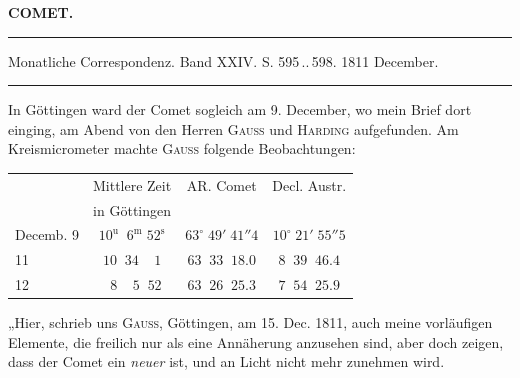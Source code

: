 \clearpage{}\hypertarget{native-348-lower}{}\label{native-348-lower}
\begin{center}\textbf{COMET.}\par\vspace{4pt}\hrule\vspace{4pt}\fontsize{10}{12}\selectfont Monatliche Correspondenz. Band XXIV. S. 595\,..\,598. 1811 December.\par\vspace{4pt}\hrule\vspace{4pt}\end{center}

\par\indent In Göttingen ward der Comet sogleich am 9. December, wo mein Brief dort einging, am Abend von den Herren \textsc{Gauss} und \textsc{Harding} aufgefunden. Am Kreismicrometer machte \textsc{Gauss} folgende Beobachtungen:

\begin{center}
\fontsize{10}{12}\selectfont\setlength{\tabcolsep}{4pt}\renewcommand{\arraystretch}{1.15}\begin{tabular}{l|c|c|c}
 & Mittlere Zeit & AR. Comet & Decl. Austr. \\
 & in Göttingen & & \\ \hline
Decemb. 9 & $10^{\mathrm u}\;\;6^{\mathrm m}\;52^{\mathrm s}$ & $63^\circ\;49'\;41''4$ & $10^\circ\;21'\;55''5$ \\
11 & $10\;\;34\;\;\;\;1$ & $63\;\;33\;\;18.0$ & $8\;\;39\;\;46.4$ \\
12 & $\;\;8\;\;\;\;5\;\;52$ & $63\;\;26\;\;25.3$ & $7\;\;54\;\;25.9$ \\
\end{tabular}
\end{center}

\par\indent „Hier, schrieb uns \textsc{Gauss}, Göttingen, am 15. Dec. 1811, auch meine vorläufigen Elemente, die freilich nur als eine Annäherung anzusehen sind, aber doch zeigen, dass der Comet ein \emph{neuer} ist, und an Licht nicht mehr zunehmen wird.

